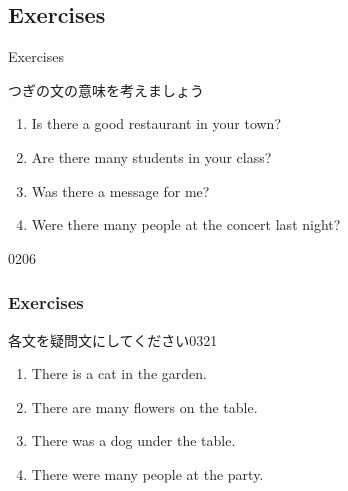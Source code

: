 \documentclass[aspectratio=169,xcolor={dvipsnames,table}]{beamer}
\newcommand{\myaudio}[1]{\href{#1}{\faVolumeUp}}
\begin{document}
 \subsection{Exercises}
\begin{frame}[plain]{Exercises}

つぎの文の意味を考えましょう
\begin{enumerate}
 \item Is there a good restaurant in your town?
 \item Are there many students in your class?
 \item Was there a message for me?
 \item Were there many people at the concert last night?
\end{enumerate}

\hfill{\tiny 0206}\,{\scriptsize \myaudio{./audio/001_there_is_07.mp3}}
\end{frame}
\begin{frame}[plain]\frametitle{Exercises}
各文を疑問文にしてください\hfill{\tiny 0321}\,{\scriptsize \myaudio{./audio/001_there_is_08.mp3}}

  \begin{enumerate}
   \item There is a cat in the garden.\\
   \item There are many flowers on the table.\\
   \item There was a dog under the table.\\
   \item There were many people at the party.\\
  \end{enumerate}
\end{frame}
\end{document}
